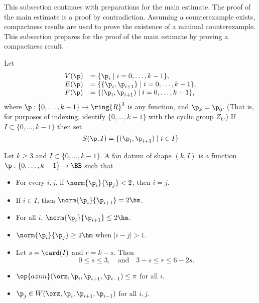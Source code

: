 This subsection continues with preparations for the main estimate.
The proof of the main estimate is a proof by contradiction. Assuming a
counterexample exists, compactness results are used to prove the
existence of a minimal counterexample.  This subsection prepares for
the proof of the main estimate by proving a compactness result.

Let 
\begin{displaymath}
\begin{array}{lll}
V(\p) &= \{\p_{i}\mid i=0,\ldots,k-1\},\\
E(\p) &= \{\{\p_{i},\p_{i+1}\}\mid i=0,\ldots,k-1\},\\
F(\p) &= \{(\p_{i},\p_{i+1}) \mid i=0,\ldots,k-1\},\\
\end{array}
\end{displaymath}
where $\p:\{0,\ldots,k-1\}\to \ring{R}^3$ is any function, and $\p_k =
\p_0$.  (That is, for purposes of indexing, identify
$\{0,\ldots,k-1\}$ with the cyclic group $Z_k$.)  If
$I\subset\{0,\ldots,k-1\}$ then set
\begin{displaymath}S(\p,I) = \{(\p_i ,\p_{i+1}) \mid i\in
I\}\end{displaymath}

\begin{definition}
 Let $k\ge3$ and $I\subset
\{0,\ldots,k-1\}$.  A fan datum of shape $(k,I)$ is a function
$\p:\{0,\ldots,k-1\}\to \BB$ such that
\begin{itemize}
\item {} For every $i,j$, if $\norm{\p_i}{\p_j}<2$, then
$i=j$.
\item {} If $i\in I$, then $\norm{\p_i}{\p_{i+1}}=2\hm$.
\item {} For all $i$, $\norm{\p_i}{\p_{i+1}} \le 2\hm$.
\item {}  $\norm{\p_i}{\p_j} \ge 2\hm$ when $|i-j|>1$.
\item {}  Let $s=\card(I)$ and $r=k-s$.  Then 
\begin{displaymath}0\le s \le 3,\quad\text{and}\quad3-s \le r \le 6
- 2s.\end{displaymath}
\item {} $\op{azim}(\orz,\p_i,\p_{i+1},\p_{i-1})\le \pi$ for
all $i$.
\item {} $\p_j\in W(\orz,\p_i,\p_{i+1},\p_{i-1})$ for all $i,j$.
\end{itemize}
\end{definition}


